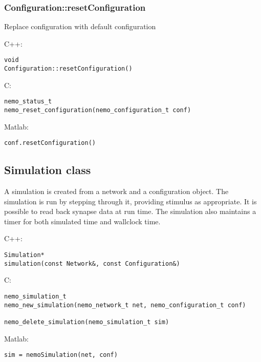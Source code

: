 \clearpage
\subsubsection*{Configuration::resetConfiguration}
\label{fn: resetConfiguration}
Replace configuration with default configuration


\noindent C++:
\begin{lstlisting}[aboveskip=2pt]
void
Configuration::resetConfiguration()
\end{lstlisting}

\noindent C:
\begin{lstlisting}[aboveskip=2pt]
nemo_status_t
nemo_reset_configuration(nemo_configuration_t conf)
\end{lstlisting}

\noindent Matlab:
\begin{lstlisting}[aboveskip=2pt]
conf.resetConfiguration()
\end{lstlisting}

\clearpage
\subsection{Simulation class}
\label{Simulation}
A simulation is created from a network and a configuration object. The simulation is run by stepping through it, providing stimulus as appropriate. It is possible to read back synapse data at run time. The simulation also maintains a timer for both simulated time and wallclock time.

\noindent C++:
\begin{lstlisting}[aboveskip=2pt]
Simulation*
simulation(const Network&, const Configuration&)
\end{lstlisting}

\noindent C:
\begin{lstlisting}[aboveskip=2pt]
nemo_simulation_t
nemo_new_simulation(nemo_network_t net, nemo_configuration_t conf)
 
nemo_delete_simulation(nemo_simulation_t sim)
\end{lstlisting}

\noindent Matlab:
\begin{lstlisting}[aboveskip=2pt]
sim = nemoSimulation(net, conf)
\end{lstlisting}
